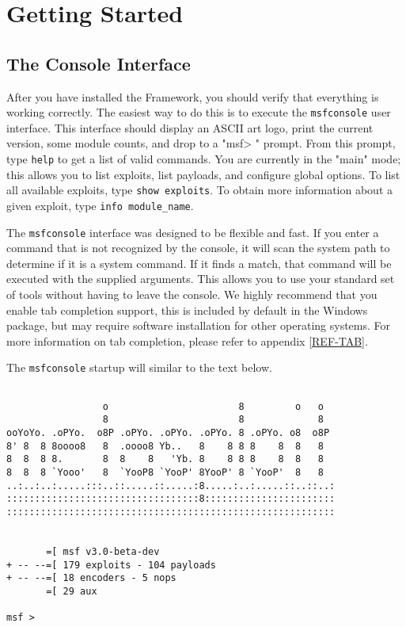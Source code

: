 \documentclass{report}
\begin{document}
\pagebreak

\chapter{Getting Started}

    \section{The Console Interface}
    \label{STARTED-CONSOLE}

\par
After you have installed the Framework, you should verify that everything is
working correctly.  The easiest way to do this is to execute the
\texttt{msfconsole} user interface. This interface should display an ASCII art
logo, print the current version, some module counts, and
drop to a "msf> " prompt. From this prompt, type \texttt{help} to get a list of
valid commands. You are currently in the "main" mode; this allows you to list
exploits, list payloads, and configure global options.  To list all available
exploits, type \texttt{show exploits}. To obtain more information about a given
exploit, type \texttt{info module\_name}. 

\par
The \texttt{msfconsole} interface was designed to be flexible and fast. If you
enter a command that is not recognized by the console, it will scan the system
path to determine if it is a system command. If it finds a match, that
command will be executed with the supplied arguments. This allows you to use
your standard set of tools without having to leave the console. We highly
recommend that you enable tab completion support, this is included by default in
the Windows package, but may require software installation for other operating
systems. For more information on tab completion, please refer to appendix
\ref{REF-TAB}.

\par
The \texttt{msfconsole} startup will similar to the text below.

\begin{verbatim}

                 o                       8         o   o
                 8                       8             8
ooYoYo. .oPYo.  o8P .oPYo. .oPYo. .oPYo. 8 .oPYo. o8  o8P
8' 8  8 8oooo8   8  .oooo8 Yb..   8    8 8 8    8  8   8
8  8  8 8.       8  8    8   'Yb. 8    8 8 8    8  8   8
8  8  8 `Yooo'   8  `YooP8 `YooP' 8YooP' 8 `YooP'  8   8
..:..:..:.....:::..::.....::.....:8.....:..:.....::..::..:
::::::::::::::::::::::::::::::::::8:::::::::::::::::::::::
::::::::::::::::::::::::::::::::::::::::::::::::::::::::::


       =[ msf v3.0-beta-dev
+ -- --=[ 179 exploits - 104 payloads
+ -- --=[ 18 encoders - 5 nops
       =[ 29 aux

msf >            
\end{verbatim}
\end{document}
